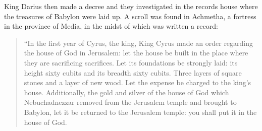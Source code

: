 
\begin{inparaenum}
     King Darius then made a decree and they investigated in the records house where the treasures of Babylon were laid up.%
     A scroll was found in Achmetha, a fortress in the province of Media, in the midst of which was written a record:%
\end{inparaenum}

\begin{quotation}
    \begin{inparaenum}\setcounter{enumi}{2}
         ``In the first year of Cyrus, the king, King Cyrus made an order regarding the house of God in Jerusalem: let the house be built in the place where they are sacrificing sacrifices. Let its foundations be strongly laid: its height sixty cubits and its breadth sixty cubits.%
         Three layers of square stones and a layer of new wood. Let the expense be charged to the king's house.%
         Additionally, the gold and silver of the house of God which Nebuchadnezzar removed from the Jerusalem temple and brought to Babylon, let it be returned to the Jerusalem temple: you shall put it in the house of God.%
        

\end{inparaenum}
\end{quotation}
